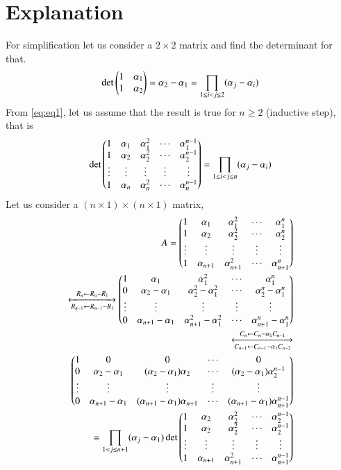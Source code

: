 \documentclass[journal,12pt,twocolumn]{IEEEtran}
\begin{document}
\section{Explanation}
For simplification let us consider a $2\times2$ matrix and find the determinant for that.
\begin{align}
    \det{\ensuremath{\begin{pmatrix}1&\alpha_1\\1&\alpha_2\end{pmatrix}}} = \alpha_2 - \alpha_1 = \prod_{1\leq i<j\leq2} (\alpha_{j}-\alpha_{i}) \label{eq:eq1}
\end{align}
From \eqref{eq:eq1}, let us assume that the result is true for $n\geq2$ (inductive step), that is
\begin{align}
    \det{\ensuremath{\begin{pmatrix}1&\alpha_1&\alpha_1^2&\cdots&\alpha_1^{n-1}\\1&\alpha_2&\alpha_2^2&\cdots&\alpha_2^{n-1}\\\vdots&\vdots&\vdots&\vdots&\vdots\\1&\alpha_n&\alpha_n^2&\cdots&\alpha_n^{n-1}\end{pmatrix}}} = \prod_{1\leq i<j\leq n} (\alpha_{j}-\alpha_{i}) \label{eq:eq2}
\end{align}
Let us consider a $(n\times1)\times(n\times1)$ matrix,
\begin{align}
    A = \begin{pmatrix}1&\alpha_1&\alpha_1^2&\cdots&\alpha_1^{n}\\1&\alpha_2&\alpha_2^2&\cdots&\alpha_2^{n}\\\vdots&\vdots&\vdots&\vdots&\vdots\\1&\alpha_{n+1}&\alpha_{n+1}^2&\cdots&\alpha_{n+1}^{n}\end{pmatrix}\\
\xleftrightarrow[R_{n-1}\leftarrow R_{n-1}-R_1]{R_n\leftarrow R_n-R_1}
\begin{pmatrix}1&\alpha_1&\alpha_1^2&\cdots&\alpha_1^{n}\\0&\alpha_2-\alpha_1&\alpha_2^2-\alpha_1^2&\cdots&\alpha_2^{n}-\alpha_1^{n}\\\vdots&\vdots&\vdots&\vdots&\vdots\\0&\alpha_{n+1}-\alpha_1&\alpha_{n+1}^2-\alpha_1^2&\cdots&\alpha_{n+1}^{n}-\alpha_1^{n}\end{pmatrix}\\
\xleftrightarrow[C_{n-1}\leftarrow C_{n-1}-\alpha_1 C_{n-2}]{C_n\leftarrow C_n-\alpha_1 C_{n-1}}\\
\begin{pmatrix}1&0&0&\cdots&0\\0&\alpha_2-\alpha_1&(\alpha_2-\alpha_1)\alpha_2&\cdots&(\alpha_2-\alpha_1)\alpha_2^{n-1}\\\vdots&\vdots&\vdots&\vdots&\vdots\\0&\alpha_{n+1}-\alpha_1&(\alpha_{n+1}-\alpha_1)\alpha_{n+1}&\cdots&(\alpha_{n+1}-\alpha_1)\alpha_{n+1}^{n-1}\end{pmatrix}\\
=\prod_{1< j\leq n+1} (\alpha_{j}-\alpha_{1}) \det{\ensuremath{\begin{pmatrix}1&\alpha_2&\alpha_2^2&\cdots&\alpha_2^{n-1}\\1&\alpha_2&\alpha_2^2&\cdots&\alpha_2^{n-1}\\\vdots&\vdots&\vdots&\vdots&\vdots\\1&\alpha_{n+1}&\alpha_{n+1}^2&\cdots&\alpha_{n+1}^{n-1}\end{pmatrix}}} \label{eq:eq3}
\end{align}
\end{document}
